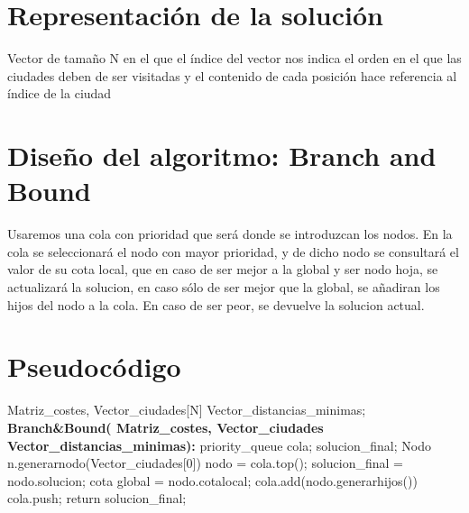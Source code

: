 	
	
	
		\section{Representación de la solución} 
		
		
Vector de tamaño N en el que el índice del vector nos indica el orden en el que las ciudades deben de ser visitadas y el contenido de cada posición hace referencia al índice de la ciudad
	
	\section{Diseño del algoritmo: Branch and Bound} 


		
		Usaremos una cola con prioridad que será donde se introduzcan los nodos.
		En la cola se seleccionará el nodo con mayor prioridad, y de dicho nodo se consultará el valor de su cota local, que en caso de ser mejor a la global  y ser nodo hoja, se actualizará la solucion, en caso sólo de ser mejor que la global, se añadiran los hijos del nodo a la cola. En caso de ser peor, se devuelve la solucion actual.
		
		

	\section{Pseudocódigo}
	


		\footnotesize{	
			\begin{algorithmic}				
				\Require Matriz\_costes, Vector\_ciudades[N] Vector\_distancias\_minimas; 
				\State \textbf{Branch\&Bound( Matriz\_costes, Vector\_ciudades Vector\_distancias\_minimas):}
				\State priority\_queue cola;
				\State solucion\_final;
				\State	 Nodo n.generarnodo(Vector\_ciudades[0])
				\State nodo = cola.top();
				\State solucion\_final = nodo.solucion;
				\State cota global = nodo.cotalocal;
				\EndIf
				\State cola.add(nodo.generarhijos())
				\State cola.push;
				\Else
				\State return solucion\_final;
				
				\EndIf
				
				\EndWhile
				
				
				
			\end{algorithmic}	
		}


